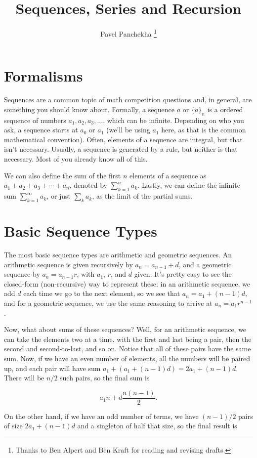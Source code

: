 \documentclass[12pt,letterpaper]{article}
\author{Pavel Panchekha \thanks{Thanks to Ben Alpert and Ben Kraft for reading and revising drafts.}}
\title{Sequences, Series and Recursion}
\begin{document}
\maketitle

\section{Formalisms}
Sequences are a common topic of math competition questions and, in
general, are something you should know about. Formally, a sequence $a$ or
$\{a\}_n$ is a ordered sequence of numbers $a_1, a_2, a_3, \ldots$, which
can be infinite. Depending on who you ask, a sequence starts at
$a_0$ or $a_1$ (we'll be using $a_1$ here, as that is the common
mathematical convention). Often, elements of a sequence are integral,
but that isn't necessary. Usually, a sequence is generated by a rule,
but neither is that necessary. Most of you already know all of this.

We can also define the sum of the first $n$ elements of a sequence as
$a_1 + a_2 + a_3 + \cdots + a_n$, denoted by $\sum_{k=1}^n a_k$.
Lastly, we can define the infinite sum $\sum_{k=1}^\infty a_k$, or
just $\sum_k a_k$, as the limit of the partial sums.

\section{Basic Sequence Types}
The most basic sequence types are arithmetic and geometric sequences.
An arithmetic sequence is given recursively by $a_n = a_{n-1} + d$,
and a geometric sequence by $a_n = a_{n-1} r$, with $a_1$, $r$, and
$d$ given. It's pretty easy to see the closed-form (non-recursive) way
to represent these: in an arithmetic sequence, we add $d$
each time we go to the next element, so we see that $a_n = a_1 + (n - 1)
d$, and for a geometric sequence, we use the same reasoning to arrive
at $a_n = a_1 r^{n - 1}$.

Now, what about sums of these sequences? Well, for an arithmetic
sequence, we can take the elements two at a time, with the first and
last being a pair, then the second and second-to-last, and so
on. Notice that all of these pairs have the same sum. Now, if we have
an even number of elements, all the numbers will be paired up, and each pair will have
sum $a_1 + (a_1 + (n - 1) d) = 2 a_1 + (n - 1) d$. There will be
$n/2$ such pairs, so the final sum is

$$a_1 n + d \frac{n (n-1)}{2}.$$

On the other hand, if we have an odd number of terms, we have
$(n-1)/2$ pairs of size $2 a_1 + (n - 1) d$ and a singleton of
half that size, so the final result is
\end{document}
